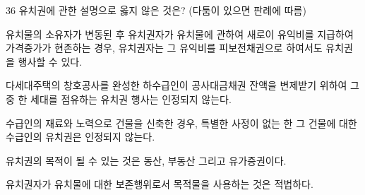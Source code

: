 \begin{question}{36}
유치권에 관한 설명으로 옳지 않은 것은? (다툼이 있으면 판례에 따름)
\begin{choices}
  \item 유치물의 소유자가 변동된 후 유치권자가 유치물에 관하여 새로이 유익비를 지급하여 가격증가가 현존하는 경우, 유치권자는 그 유익비를 피보전채권으로 하여서도 유치권을 행사할 수 있다.
  \item 다세대주택의 창호공사를 완성한 하수급인이 공사대금채권 잔액을 변제받기 위하여 그 중 한 세대를 점유하는 유치권 행사는 인정되지 않는다.
  \item 수급인의 재료와 노력으로 건물을 신축한 경우, 특별한 사정이 없는 한 그 건물에 대한 수급인의 유치권은 인정되지 않는다.
  \item 유치권의 목적이 될 수 있는 것은 동산, 부동산 그리고 유가증권이다.
  \item 유치권자가 유치물에 대한 보존행위로서 목적물을 사용하는 것은 적법하다.
\end{choices}
\end{question}

